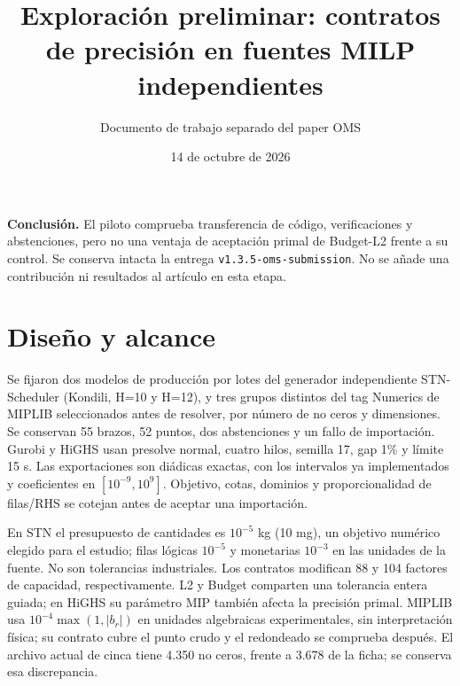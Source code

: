 \documentclass[11pt]{article}
\title{Exploración preliminar: contratos de precisión en fuentes MILP independientes}
\author{Documento de trabajo separado del paper OMS}
\date{14 de octubre de 2026}
\begin{document}
\maketitle
\noindent\textbf{Conclusión.} El piloto comprueba transferencia de código, verificaciones
y abstenciones, pero no una ventaja de aceptación primal de Budget-L2 frente a su
control. Se conserva intacta la entrega \texttt{v1.3.5-oms-submission}.
No se añade una contribución ni resultados al artículo en esta etapa.

\section{Diseño y alcance}
Se fijaron dos modelos de producción por lotes del generador independiente
STN-Scheduler (Kondili, H=10 y H=12), y tres grupos distintos del tag Numerics de
MIPLIB seleccionados antes de resolver, por número de no ceros y dimensiones.
Se conservan 55 brazos, 52 puntos, dos abstenciones y un fallo de importación.
Gurobi y HiGHS usan presolve normal, cuatro hilos, semilla 17, gap 1\% y límite 15 s.
Las exportaciones son diádicas exactas, con los intervalos ya implementados y
coeficientes en $[10^{-9},10^9]$. Objetivo, cotas, dominios y proporcionalidad de
filas/RHS se cotejan antes de aceptar una importación.

En STN el presupuesto de cantidades es $10^{-5}$ kg (10 mg), un objetivo numérico
elegido para el estudio; filas lógicas $10^{-5}$ y monetarias $10^{-3}$ en las
unidades de la fuente. No son tolerancias industriales. Los contratos modifican
88 y 104 factores de capacidad, respectivamente. L2 y Budget comparten una
tolerancia entera guiada; en HiGHS su parámetro MIP también afecta la precisión
primal. MIPLIB usa $10^{-4}\max(1,|b_r|)$ en unidades algebraicas experimentales,
sin interpretación física; su contrato cubre el punto crudo y el redondeado se
comprueba después. El archivo actual de cinca tiene 4.350 no ceros, frente a
3.678 de la ficha; se conserva esa discrepancia.
\end{document}
